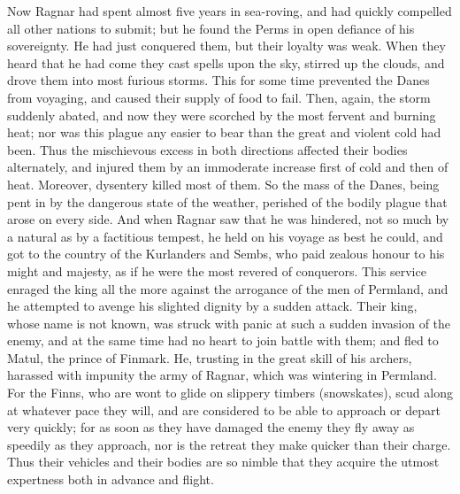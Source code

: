 \documentclass[10pt,a4paper]{report}
\begin{document}
Now Ragnar had spent almost five years in sea-roving, and had quickly compelled all other nations to submit; but he found the Perms in open defiance of his sovereignty. He had just conquered them, but their loyalty was weak. When they heard that he had come they cast spells upon the sky, stirred up the clouds, and drove them into most furious storms. This for some time prevented the Danes from voyaging, and caused their supply of food to fail. Then, again, the storm suddenly abated, and now they were scorched by the most fervent and burning heat; nor was this plague any easier to bear than the great and violent cold had been. Thus the mischievous excess in both directions affected their bodies alternately, and injured them by an immoderate increase first of cold and then of heat. Moreover, dysentery killed most of them. So the mass of the Danes, being pent in by the dangerous state of the weather, perished of the bodily plague that arose on every side. And when Ragnar saw that he was hindered, not so much by a natural as by a factitious tempest, he held on his voyage as best he could, and got to the country of the Kurlanders and Sembs, who paid zealous honour to his might and majesty, as if he were the most revered of conquerors. This service enraged the king all the more against the arrogance of the men of Permland, and he attempted to avenge his slighted dignity by a sudden attack. Their king, whose name is not known, was struck with panic at such a sudden invasion of the enemy, and at the same time had no heart to join battle with them; and fled to Matul, the prince of Finmark. He, trusting in the great skill of his archers, harassed with impunity the army of Ragnar, which was wintering in Permland. For the Finns, who are wont to glide on slippery timbers (snowskates), scud along at whatever pace they will, and are considered to be able to approach or depart very quickly; for as soon as they have damaged the enemy they fly away as speedily as they approach, nor is the retreat they make quicker than their charge. Thus their vehicles and their bodies are so nimble that they acquire the utmost expertness both in advance and flight.\\
\end{document}
